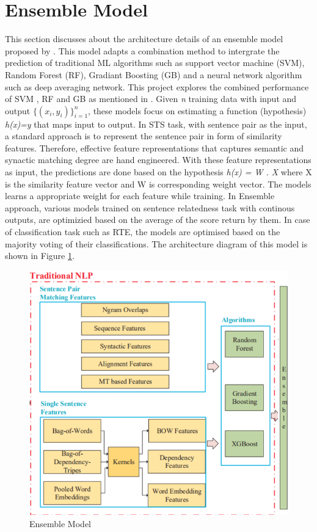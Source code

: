 \documentclass[12pt]{report} %
\begin{document}
\section{Ensemble Model}

	This section discusses about the architecture details of an ensemble model proposed by \cite{tian2017ecnu}. This model adapts a combination method to intergrate the prediction of traditional ML algorithms such as support vector machine (SVM), Random Forest (RF), Gradiant Boosting (GB) and a neural network algorithm such as deep averaging network. This project explores the combined performance of SVM , RF and GB as mentioned in \citep{tian2017ecnu}. Given \textit{n} training data with input and output $ \{(x_i,y_i)\}^{n}_{i=1} $, these models focus on estimating a function (hypothesis) \textit{h(x)=y} that maps input to output. In STS task, with sentence pair as the input, a standard approach is to represent the sentence pair in form of similarity features. Therefore,  effective feature representations that captures semantic and synactic matching degree are hand engineered. With these feature representations as input, the predictions are done based on the hypothesis \textit{h(x) = W . X} where X is the similarity feature vector and W is corresponding weight vector.  The models learns a appropriate weight for each feature while training. In Ensemble approach, various models trained on sentence relatedness task with continous outputs, are optimizied based on the average of the score return by them. In case of classification task such as RTE, the models are optimised based on the majority voting of their classifications. The architecture diagram of this model is shown in Figure \ref{ensemble}.
	
	\begin{figure}[!tbp]
		\centering
		\includegraphics[scale=0.40]{image/Ensemble.png}
		\caption{Ensemble Model \citep{tian2017ecnu}}
		\label{ensemble}
	\end{figure}
	
\end{document}
